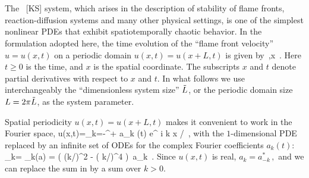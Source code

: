 

\section{\KSe}
\label{s-KS}


The \KS\ [KS] system, which arises in the description of
stability of flame fronts, reaction-diffusion systems and many other
physical settings, is one of the simplest nonlinear PDEs that
exhibit spatiotemporally chaotic behavior. In the formulation
adopted here, the time evolution of the ``flame front velocity''
$u=u(x,t)$ on a periodic domain $u(x,t) = u(x+L,t)$ is given by
\beq
{}
    \,,\qquad   x \in [0,L]
    \,.
Here $t \geq 0$ is the time, and
$x$ is the spatial coordinate.
The subscripts $x$ and $t$ denote partial derivatives with respect to
$x$ and $t$. In what follows we use interchangeably the ``dimensionless
system size'' $\tilde{L}$, or the periodic domain size $L= 2\pi \tilde{L}$,
as the system parameter.

Spatial periodicity $u(x,t)=u(x+L,t)$
makes it convenient to work in the Fourier space,
\beq
  u(x,t)=\sum_{k=-\infty}^{+\infty} a_k (t) e^{ i k x /\tildeL }
\,,
with the $1$-dimensional PDE 
replaced by an infinite set of
ODEs for the complex Fourier coefficients $a_k(t)$:
\beq
{}_k= \pVeloc_k(a)
     = ( (k/\tildeL)^2 - ( k/\tildeL)^4 )\, a_k
\,.
Since $u(x,t)$ is real,
$ %
a_k=a_{-k}^*
\,,
$ %
and we can replace the sum in  by a
sum over $k > 0$.

